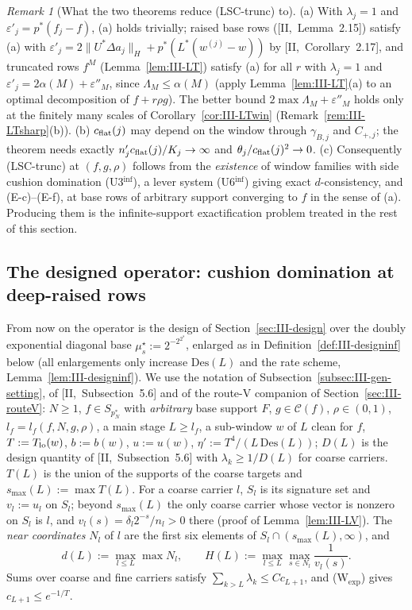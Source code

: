 \documentclass[10pt]{amsart}
\theoremstyle{definition}
\theoremstyle{remark}
\newtheorem{remark}[theorem]{Remark}
\newcommand{\Cset}{\mathcal C}
\begin{document}
\begin{remark}[What the two theorems reduce \textup{(LSC-trunc)} to]
\label{rem:III-reduction}
(a) With $\lambda_j=1$ and $\varepsilon'_j=p^*(f_j-f)$, (a) holds trivially;
raised base rows ([II,~Lemma~2.15]) satisfy (a) with $\varepsilon'_j=
2\|U^*\Delta a_j\|_H+p^*(L^*(w^{(j)}-w))$ by [II,~Corollary~2.17], and
truncated rows $f^M$ (Lemma~\ref{lem:III-LT}) satisfy (a) for all $r$ with
$\lambda_j=1$ and $\varepsilon'_j=2\alpha(M)+\varepsilon''_M$, since
$\Lambda_M\le\alpha(M)$ (apply Lemma~\ref{lem:III-LT}(a) to an optimal
decomposition of $f+r\rho g$).  The better bound $2\max\Lambda_M+
\varepsilon''_M$ holds only at the finitely many scales of
Corollary~\ref{cor:III-LTwin} (Remark~\ref{rem:III-LTsharp}(b)).  (b) $c_{\rm flat}(j)$ may depend on the
window through $\gamma_{B,j}$ and $C_{+,j}$; the theorem needs exactly
$n'_jc_{\rm flat}(j)/K_j\to\infty$ and $\theta_j/c_{\rm flat}(j)^2\to0$.  (c)
Consequently \textup{(LSC-trunc)} at $(f,g,\rho)$ follows from the
\emph{existence} of window families with side cushion domination
(U3$^{\inf}$), a lever system (U6$^{\inf}$) giving exact $d$-consistency, and
(E-c)--(E-f), at base rows of arbitrary support converging to $f$ in the
sense of (a).  Producing them is the infinite-support exactification problem
treated in the rest of this section.
\end{remark}

\subsection{The designed operator: cushion domination at deep-raised rows}
\label{subsec:III-cushion}

From now on the operator is the design of Section~\ref{sec:III-design} over the
doubly exponential diagonal base $\mu^\star_s:=2^{-2^{2^s}}$, enlarged as in
Definition~\ref{def:III-designinf} below (all enlargements only increase
$\mathrm{Des}(L)$ and the rate scheme, Lemma~\ref{lem:III-designinf}).  We use
the notation of Subsection~\ref{subsec:III-gen-setting}, of
[II,~Subsection~5.6] and of the route-V companion of
Section~\ref{sec:III-routeV}: $N\ge1$, $f\in S_{p_N^*}$ with \emph{arbitrary}
base support $F$, $g\in\Cset(f)$, $\rho\in(0,1)$, $l_f=l_f(f,N,g,\rho)$, a main
stage $L\ge l_f$, a sub-window $w$ of $L$ clean for $f$, $T:=T_{\rm lo}(w)$,
$b:=b(w)$, $u:=u(w)$, $\eta':=T^4/(L\,\mathrm{Des}(L))$; $D(L)$ is the design
quantity of [II,~Subsection~5.6] with $\lambda_k\ge1/D(L)$ for coarse
carriers.  $T(L)$ is the union of the supports of the coarse targets and
$s_{\max}(L):=\max T(L)$.  For a coarse carrier $l$, $S_l$ is its signature
set and $v_l:=u_l$ on $S_l$; beyond $s_{\max}(L)$ the only coarse carrier
whose vector is nonzero on $S_l$ is $l$, and $v_l(s)=\delta_l2^{-s}/n_l>0$
there (proof of Lemma~\ref{lem:III-LV}).  The \emph{near coordinates} $N_l$ of
$l$ are the first six elements of $S_l\cap(s_{\max}(L),\infty)$, and
\[
 d(L):=\max_{l\le L}\max N_l,\qquad H(L):=\max_{l\le L}\max_{s\in N_l}
 \frac1{v_l(s)} .
\]
Sums over coarse and fine carriers satisfy $\sum_{k>L}\lambda_k\le Cc_{L+1}$,
and (W$_{\exp}$) gives $c_{L+1}\le e^{-1/T}$.
\end{document}
